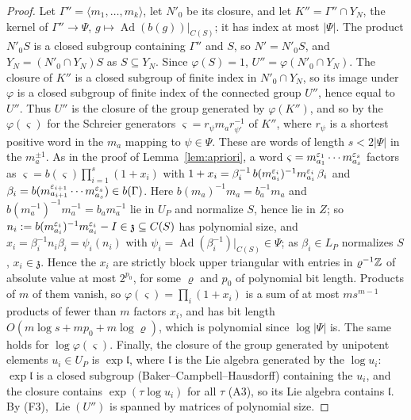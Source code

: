 \begin{proof}
Let $\Gamma''=\langle m_1,\ldots,m_k\rangle$, let $N'_0$ be its closure, and let $K''=\Gamma''\cap Y_N$, the kernel of
$\Gamma''\to\Psi$, $g\mapsto\operatorname{Ad}(b(g))|_{C(S)}$; it has index at most $|\Psi|$. The product $N'_0S$ is a closed
subgroup containing $\Gamma''$ and $S$, so $N'=N'_0S$, and $Y_N=(N'_0\cap Y_N)S$ as $S\subseteq Y_N$. Since
$\varphi(S)=1$, $U''=\varphi(N'_0\cap Y_N)$. The closure of $K''$ is a closed subgroup of finite index in
$N'_0\cap Y_N$, so its image under $\varphi$ is a closed subgroup of finite index of the connected group $U''$,
hence equal to $U''$. Thus $U''$ is the closure of the group generated by $\varphi(K'')$, and so by the
$\varphi(\varsigma)$ for the Schreier generators $\varsigma=r_\psi m_ar_{\psi'}^{-1}$ of $K''$, where $r_\psi$ is a
shortest positive word in the $m_a$ mapping to $\psi\in\Psi$. These are words of length $s<2|\Psi|$ in the
$m_a^{\pm1}$. As in the proof of Lemma~\ref{lem:apriori}, a word
$\varsigma=m_{a_1}^{\varepsilon_1}\cdots m_{a_s}^{\varepsilon_s}$ factors as $\varsigma=b(\varsigma)\prod_{i=1}^s(1+x_i)$ with
$1+x_i=\beta_i^{-1}\,b(m_{a_i}^{\varepsilon_i})^{-1}m_{a_i}^{\varepsilon_i}\,\beta_i$ and
$\beta_i=b(m_{a_{i+1}}^{\varepsilon_{i+1}}\cdots m_{a_s}^{\varepsilon_s})\in b(\Gamma)$. Here
$b(m_a)^{-1}m_a=b_a^{-1}m_a$ and $b(m_a^{-1})^{-1}m_a^{-1}=b_am_a^{-1}$ lie in $U_P$ and normalize $S$, hence lie
in $Z$; so $n_i:=b(m_{a_i}^{\varepsilon_i})^{-1}m_{a_i}^{\varepsilon_i}-I\in\mathfrak z\subseteq C(S)$ has polynomial size, and
$x_i=\beta_i^{-1}n_i\beta_i=\psi_i(n_i)$ with $\psi_i=\operatorname{Ad}(\beta_i^{-1})|_{C(S)}\in\Psi$; as
$\beta_i\in L_P$ normalizes $S$, $x_i\in\mathfrak z$. Hence the $x_i$ are strictly block upper triangular with
entries in $\varrho^{-1}\mathbb{Z}$ of absolute value at most $2^{p_0}$, for some $\varrho$ and $p_0$ of polynomial
bit length.
Products of $m$ of them vanish, so $\varphi(\varsigma)=\prod_i(1+x_i)$ is a sum of at most $ms^{m-1}$ products of
fewer than $m$ factors $x_i$, and has bit length $O(m\log s+mp_0+m\log\varrho)$, which is polynomial since
$\log|\Psi|$ is. The same holds for $\log\varphi(\varsigma)$. Finally, the closure of the group generated by
unipotent elements $u_i\in U_P$ is $\exp\mathfrak l$, where $\mathfrak l$ is the Lie algebra generated by the
$\log u_i$: $\exp\mathfrak l$ is a closed subgroup (Baker--Campbell--Hausdorff) containing the $u_i$, and the
closure contains $\exp(\tau\log u_i)$ for all $\tau$ (A3), so its Lie algebra contains $\mathfrak l$. By (F3),
$\operatorname{Lie}(U'')$ is spanned by matrices of polynomial size.
\end{proof}

